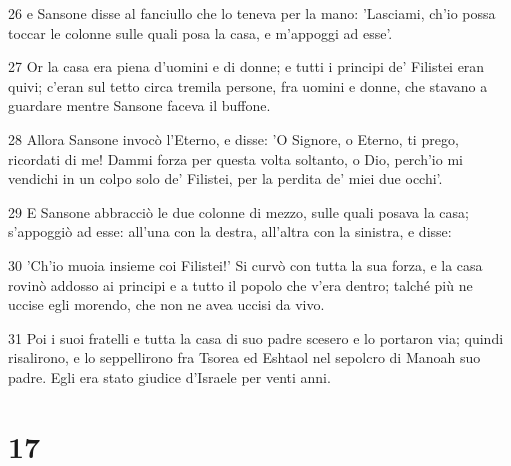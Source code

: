 \par 26 e Sansone disse al fanciullo che lo teneva per la mano: 'Lasciami, ch'io possa toccar le colonne sulle quali posa la casa, e m'appoggi ad esse'.
\par 27 Or la casa era piena d'uomini e di donne; e tutti i principi de' Filistei eran quivi; c'eran sul tetto circa tremila persone, fra uomini e donne, che stavano a guardare mentre Sansone faceva il buffone.
\par 28 Allora Sansone invocò l'Eterno, e disse: 'O Signore, o Eterno, ti prego, ricordati di me! Dammi forza per questa volta soltanto, o Dio, perch'io mi vendichi in un colpo solo de' Filistei, per la perdita de' miei due occhi'.
\par 29 E Sansone abbracciò le due colonne di mezzo, sulle quali posava la casa; s'appoggiò ad esse: all'una con la destra, all'altra con la sinistra, e disse:
\par 30 'Ch'io muoia insieme coi Filistei!' Si curvò con tutta la sua forza, e la casa rovinò addosso ai principi e a tutto il popolo che v'era dentro; talché più ne uccise egli morendo, che non ne avea uccisi da vivo.
\par 31 Poi i suoi fratelli e tutta la casa di suo padre scesero e lo portaron via; quindi risalirono, e lo seppellirono fra Tsorea ed Eshtaol nel sepolcro di Manoah suo padre. Egli era stato giudice d'Israele per venti anni.

\chapter{17}

